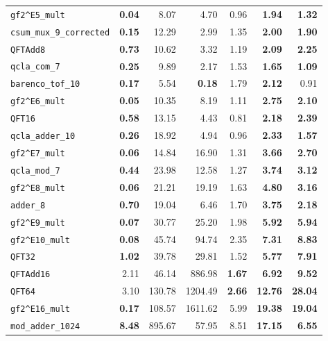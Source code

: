 \begin{table}[p]
\begin{tabular}{l|rrr|rrr}
\texttt{gf2\textasciicircum{}E5\_mult} & \textbf{0.04} & 8.07 & 4.70 & 0.96 & \textbf{1.94} & \textbf{1.32} \\
\texttt{csum\_mux\_9\_corrected} & \textbf{0.15} & 12.29 & 2.99 & 1.35 & \textbf{2.00} & \textbf{1.90} \\
\texttt{QFTAdd8} & \textbf{0.73} & 10.62 & 3.32 & 1.19 & \textbf{2.09} & \textbf{2.25} \\
\texttt{qcla\_com\_7} & \textbf{0.25} & 9.89 & 2.17 & 1.53 & \textbf{1.65} & \textbf{1.09} \\
\texttt{barenco\_tof\_10} & \textbf{0.17} & 5.54 & \textbf{0.18} & 1.79 & \textbf{2.12} & 0.91 \\
\texttt{gf2\textasciicircum{}E6\_mult} & \textbf{0.05} & 10.35 & 8.19 & 1.11 & \textbf{2.75} & \textbf{2.10} \\
\texttt{QFT16} & \textbf{0.58} & 13.15 & 4.43 & 0.81 & \textbf{2.18} & \textbf{2.39} \\
\texttt{qcla\_adder\_10} & \textbf{0.26} & 18.92 & 4.94 & 0.96 & \textbf{2.33} & \textbf{1.57} \\
\texttt{gf2\textasciicircum{}E7\_mult} & \textbf{0.06} & 14.84 & 16.90 & 1.31 & \textbf{3.66} & \textbf{2.70} \\
\texttt{qcla\_mod\_7} & \textbf{0.44} & 23.98 & 12.58 & 1.27 & \textbf{3.74} & \textbf{3.12} \\
\texttt{gf2\textasciicircum{}E8\_mult} & \textbf{0.06} & 21.21 & 19.19 & 1.63 & \textbf{4.80} & \textbf{3.16} \\
\texttt{adder\_8} & \textbf{0.70} & 19.04 & 6.46 & 1.70 & \textbf{3.75} & \textbf{2.18} \\
\texttt{gf2\textasciicircum{}E9\_mult} & \textbf{0.07} & 30.77 & 25.20 & 1.98 & \textbf{5.92} & \textbf{5.94} \\
\texttt{gf2\textasciicircum{}E10\_mult} & \textbf{0.08} & 45.74 & 94.74 & 2.35 & \textbf{7.31} & \textbf{8.83} \\
\texttt{QFT32} & \textbf{1.02} & 39.78 & 29.81 & 1.52 & \textbf{5.77} & \textbf{7.91} \\
\texttt{QFTAdd16} & 2.11 & 46.14 & 886.98 & \textbf{1.67} & \textbf{6.92} & \textbf{9.52} \\
\texttt{QFT64} & 3.10 & 130.78 & 1204.49 & \textbf{2.66} & \textbf{12.76} & \textbf{28.04} \\
\texttt{gf2\textasciicircum{}E16\_mult} & \textbf{0.17} & 108.57 & 1611.62 & 5.99 & \textbf{19.38} & \textbf{19.04} \\
\texttt{mod\_adder\_1024} & \textbf{8.48} & 895.67 & 57.95 & 8.51 & \textbf{17.15} & \textbf{6.55} \\

\end{tabular}
\end{table}
